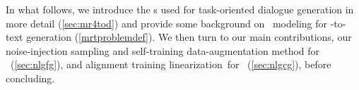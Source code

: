 In what follows, we introduce the \meaningrepresentation s used for
task-oriented dialogue generation in more detail (\autoref{sec:mr4tod}) and
provide some background on \sequencetosequence~modeling for
\meaningrepresentation-to-text generation (\autoref{mrtproblemdef}). We then
turn to our main contributions, our noise-injection sampling and self-training
data-augmentation method for \faithfulgeneration~(\autoref{sec:nlgfg}), and
alignment training linearization~for
\controllablegeneration~(\autoref{sec:nlgcg}), before concluding.
